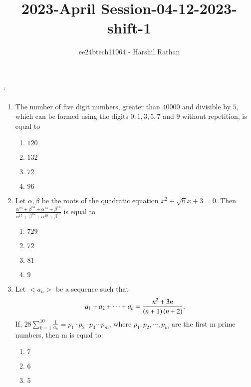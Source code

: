 \documentclass[journal,12pt,twocolumn]{IEEEtran}
\theoremstyle{remark}
\begin{document}

\vspace{3cm}

\title{2023-April Session-04-12-2023-shift-1}
\author{ee24btech11064 - Harshil Rathan}
\maketitle
\newpage
\bigskip

\renewcommand{\thefigure}{\theenumi}
`\renewcommand{\thetable}{\theenumi}
\begin{enumerate}
\item The number of five digit numbers, greater than $40000$ and divisible by $5$, which can be formed using the digits $0, 1, 3, 5, 7$ and $9$ without repetition, is equal to 
\begin{multicols}{2}
\begin{enumerate}
    \item $120$
    \item $132$
    \item $72$
    \item $96$ 
\end{enumerate}
\end{multicols}
\bigskip
\item Let $\alpha,\beta$ be the roots of the quadratic equation $x^2+\sqrt{6}x+3=0$. Then $\frac{\alpha^{23}+\beta^{23}+\alpha^{14}+\beta^{14}}{\alpha^{15}+\beta^{15}+\alpha^{10}+\beta^{10}}$ is equal to
\begin{multicols}{2}
\begin{enumerate}
    \item $729$
    \item $72$
    \item $81$
    \item $9$
\end{enumerate}
\end{multicols}
\bigskip
\item Let $<a_n>$ be a sequence such that 
\begin{align*}
    a_1+a_2+\cdots +a_n=\frac{n^2+3n}{\left(n+1\right)\left(n+2\right)}.
\end{align*}
If, $28\sum_{k=1}^{10} \frac{1}{a_k} = p_1 \cdot p_2 \cdot p_3 \cdots p_m$, where $p_1, p_2, \cdots, p_m$
are the first m prime numbers, then m is equal to:
\begin{multicols}{2}
\begin{enumerate}
       \item $7$
       \item $6$
       \item $5$

\end{enumerate}
\end{multicols}
\end{enumerate}
\end{document}
